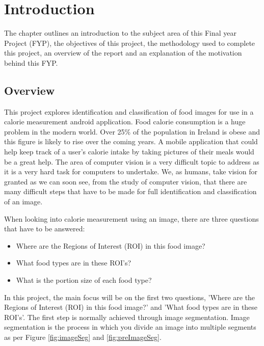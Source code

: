 \chapter{Introduction}
\label{intro}
The chapter outlines an introduction to the subject area of this Final year Project (FYP), the objectives of this project, the methodology used to complete this project, an overview of the report and an explanation of the motivation behind this FYP.



\section{Overview}
This project explores identification and classification of food images for use in a calorie measurement android application.
Food calorie consumption is a huge problem in the modern world.
Over 25\% of the population in Ireland is obese and this figure is likely to rise over the coming years.
A mobile application that could help keep track of a user's calorie intake by taking pictures of their meals would be a great help.
The area of computer vision is a very difficult topic to address as it is a very hard task for computers to undertake.
We, as humans, take vision for granted as we can soon see, from the study of computer vision, that there are many difficult steps that have to be made for full identification and classification of an image.

When looking into calorie measurement using an image, there are three questions that have to be answered:
\begin{itemize}
	\item{Where are the Regions of Interest (ROI) in this food image?}
	\item{What food types are in these ROI's?}
	\item{What is the portion size of each food type?}
\end{itemize}

In this project, the main focus will be on the first two questions, 'Where are the
Regions of Interest (ROI) in this food image?' and 'What food types are in these ROI's'. The first step is normally achieved through image segmentation. Image segmentation is the process in which you divide an image into multiple segments as per Figure \ref{fig:imageSeg} and \ref{fig:preImageSeg}.

